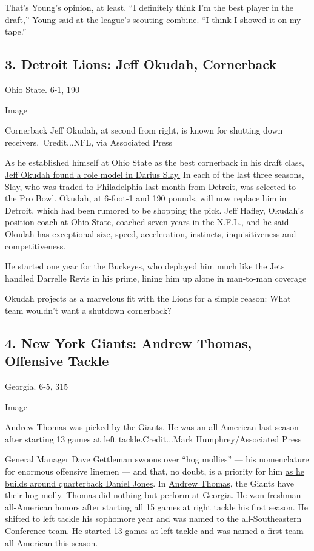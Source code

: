 That's Young's opinion, at least. ``I definitely think I'm the best
player in the draft,'' Young said at the league's scouting combine. ``I
think I showed it on my tape.''

\hypertarget{3-detroit-lions-jeff-okudah-cornerback}{%
\subsection{3. Detroit Lions: Jeff Okudah,
Cornerback}\label{3-detroit-lions-jeff-okudah-cornerback}}

Ohio State. 6-1, 190

Image

Cornerback Jeff Okudah, at second from right, is known for shutting down
receivers.~Credit...NFL, via Associated Press

As he established himself at Ohio State as the best cornerback in his
draft class,
\href{https://www.nytimes3xbfgragh.onion/article/jeff-okudah.html}{Jeff
Okudah found a role model in Darius Slay.} In each of the last three
seasons, Slay, who was traded to Philadelphia last month from Detroit,
was selected to the Pro Bowl. Okudah, at 6-foot-1 and 190 pounds, will
now replace him in Detroit, which had been rumored to be shopping the
pick. Jeff Hafley, Okudah's position coach at Ohio State, coached seven
years in the N.F.L., and he said Okudah has exceptional size, speed,
acceleration, instincts, inquisitiveness and competitiveness.

He started one year for the Buckeyes, who deployed him much like the
Jets handled Darrelle Revis in his prime, lining him up alone in
man-to-man coverage

Okudah projects as a marvelous fit with the Lions for a simple reason:
What team wouldn't want a shutdown cornerback?

\hypertarget{4-new-york-giants-andrew-thomas-offensive-tackle}{%
\subsection{4. New York Giants: Andrew Thomas, Offensive
Tackle}\label{4-new-york-giants-andrew-thomas-offensive-tackle}}

Georgia. 6-5, 315

Image

Andrew Thomas was picked by the Giants. He was an all-American last
season after starting 13 games at left tackle.Credit...Mark
Humphrey/Associated Press

General Manager Dave Gettleman swoons over ``hog mollies'' --- his
nomenclature for enormous offensive linemen --- and that, no doubt, is a
priority for him
\href{https://www.nytimes3xbfgragh.onion/2020/04/22/sports/football/nfl-draft-giants-jets.html}{as
he builds around quarterback Daniel Jones}. In
\href{https://www.nytimes3xbfgragh.onion/article/andrew-thomas.html}{Andrew
Thomas}, the Giants have their hog molly. Thomas did nothing but perform
at Georgia. He won freshman all-American honors after starting all 15
games at right tackle his first season. He shifted to left tackle his
sophomore year and was named to the all-Southeastern Conference team. He
started 13 games at left tackle and was named a first-team all-American
this season.

